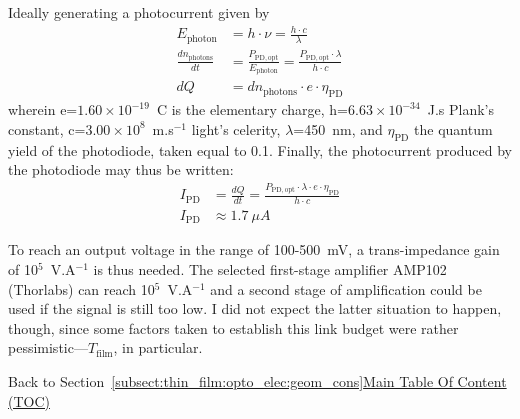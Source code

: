 Ideally generating a photocurrent given by
\begin{equation}
	\begin{aligned}
		E_\mathrm{photon} &= h \cdot \nu = \frac{h \cdot c}{\lambda} \\
		\frac{dn_\mathrm{photons}}{dt} &= \frac{P_\mathrm{PD,opt}}{E_\mathrm{photon}} = \frac{P_\mathrm{PD,opt} \cdot \lambda}{h \cdot c} \\
		dQ &= dn_\mathrm{photons} \cdot e \cdot \eta_\mathrm{PD}
	\end{aligned}
\end{equation}
wherein e=$1.60\times10^{-19}$~C is the elementary charge, h=$6.63\times10^{-34}$~J.s Plank's constant, c=$3.00\times10^{8}$~m.s$^{-1}$ light's celerity, $\lambda$=450~nm, and $\eta_\mathrm{PD}$ the quantum yield of the photodiode, taken equal to 0.1. Finally, the photocurrent produced by the photodiode may thus be written:
\begin{equation}
	\begin{aligned}
		I_\mathrm{PD} &= \frac{dQ}{dt} = \frac{P_\mathrm{PD,opt} \cdot \lambda \cdot e \cdot \eta_\mathrm{PD}}{h \cdot c} \\
		I_\mathrm{PD} &\approx 1.7~\mu A
	\end{aligned}
\end{equation}

To reach an output voltage in the range of 100-500~mV, a trans-impedance gain of 10$^5$~V.A$^{-1}$ is thus needed. The selected first-stage amplifier AMP102 (Thorlabs) can reach 10$^5$~V.A$^{-1}$ and a second stage of amplification could be used if the signal is still too low. I did not expect the latter situation to happen, though, since some factors taken to establish this link budget were rather pessimistic---$T_\mathrm{film}$, in particular.

\begin{appbox}
	Back to Section~\ref{subsect:thin_film:opto_elec:geom_cons}\hfill \hyperref[chapter:toc]{Main Table Of Content (TOC)}
\end{appbox}